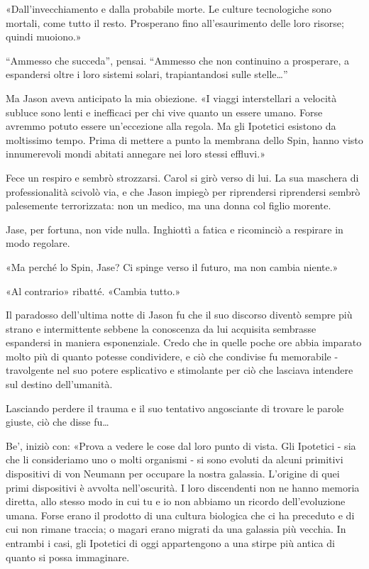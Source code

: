 «Dall'invecchiamento e dalla probabile morte. Le culture tecnologiche
sono mortali, come tutto il resto. Prosperano fino all'esaurimento delle
loro risorse; quindi muoiono.»

``Ammesso che succeda'', pensai. ``Ammesso che non continuino a
prosperare, a espandersi oltre i loro sistemi solari, trapiantandosi
sulle stelle\ldots''

Ma Jason aveva anticipato la mia obiezione. «I viaggi interstellari a
velocità subluce sono lenti e inefficaci per chi vive quanto un essere
umano. Forse avremmo potuto essere un'eccezione alla regola. Ma gli
Ipotetici esistono da moltissimo tempo. Prima di mettere a punto la
membrana dello Spin, hanno visto innumerevoli mondi abitati annegare nei
loro stessi effluvi.»

Fece un respiro e sembrò strozzarsi. Carol si girò verso di lui. La sua
maschera di professionalità scivolò via, e che Jason impiegò per
riprendersi riprendersi sembrò palesemente terrorizzata: non un medico,
ma una donna col figlio morente.

Jase, per fortuna, non vide nulla. Inghiottì a fatica e ricominciò a
respirare in modo regolare.

«Ma perché lo Spin, Jase? Ci spinge verso il futuro, ma non cambia
niente.»

«Al contrario» ribatté. «Cambia tutto.»

\separatorefiori

Il paradosso dell'ultima notte di Jason fu che il suo discorso diventò
sempre più strano e intermittente sebbene la conoscenza da lui acquisita
sembrasse espandersi in maniera esponenziale. Credo che in quelle poche
ore abbia imparato molto più di quanto potesse condividere, e ciò che
condivise fu memorabile - travolgente nel suo potere esplicativo e
stimolante per ciò che lasciava intendere sul destino dell'umanità.

Lasciando perdere il trauma e il suo tentativo angosciante di trovare le
parole giuste, ciò che disse fu\ldots{}

Be', iniziò con: «Prova a vedere le cose dal loro punto di vista. Gli
Ipotetici - sia che li consideriamo uno o molti organismi - si sono
evoluti da alcuni primitivi dispositivi di von Neumann per occupare la
nostra galassia. L'origine di quei primi dispositivi è avvolta
nell'oscurità. I loro discendenti non ne hanno memoria diretta, allo
stesso modo in cui tu e io non abbiamo un ricordo dell'evoluzione umana.
Forse erano il prodotto di una cultura biologica che ci ha preceduto e
di cui non rimane traccia; o magari erano migrati da una galassia più
vecchia. In entrambi i casi, gli Ipotetici di oggi appartengono a una
stirpe più antica di quanto si possa immaginare.

